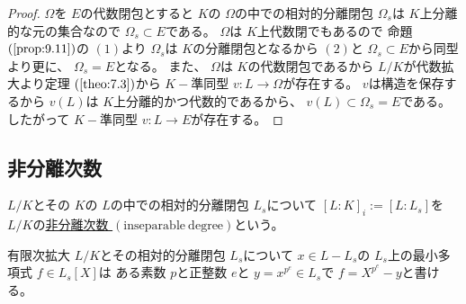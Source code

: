 \documentclass[../master_galois_theory]{subfiles}
\begin{document}
\begin{proof}
  $\Omega$を $E$の代数閉包とすると
  $K$の $\Omega$の中での相対的分離閉包 $\Omega_s$は
  $K$上分離的な元の集合なので $\Omega_s \subset E$である。
  $\Omega$は $K$上代数閉でもあるので
  命題 $(\mathrm{\ref{prop:9.11}})$の $(1)$より
  $\Omega_s$は $K$の分離閉包となるから $(2)$と
  $\Omega_s \subset E$から同型より更に、
  $\Omega_s = E$となる。
  また、 $\Omega$は $K$の代数閉包であるから
  $L/K$が代数拡大より定理 $(\mathrm{\ref{theo:7.3}})$から
  $K-$準同型 $v:L \longrightarrow \Omega$が存在する。
  $v$は構造を保存するから $v(L)$は $K$上分離的かつ代数的であるから、
  $v(L) \subset \Omega_s = E$である。
  したがって $K-$準同型 $v:L \longrightarrow E$が存在する。
\end{proof}

\subsection{非分離次数}

\begin{defi}
  $L/K$とその $K$の $L$の中での相対的分離閉包 $L_s$について
  $[L:K]_i := [L:L_s]$を $L/K$の\underline{非分離次数 $(\mathrm{inseparable \  degree})$}という。
\end{defi}

\begin{lemm} \label{lemm:bunriminimalpolynomial}
  有限次拡大 $L/K$とその相対的分離閉包 $L_s$について
  $x \in L - L_s$の $L_s$上の最小多項式 $f \in L_s[X]$は
  ある素数 $p$と正整数 $e$と $y = x^{p^e} \in L_s$で
  $f = X^{p^e} - y$と書ける。
\end{lemm}
\end{document}
